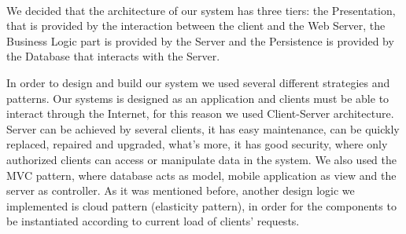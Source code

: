 	
	\paragraph{} We decided that the architecture of our system has three tiers: the Presentation, that is provided by the interaction between the client and the Web Server, the Business Logic part is provided by the Server and the Persistence is provided by the Database that interacts with the Server.  	
	
	 In order to design and build our system we used several different strategies and patterns. Our systems is designed as an application and clients must be able to interact through the Internet, for this reason we used Client-Server architecture. Server can be achieved by several clients, it has easy maintenance, can be quickly replaced, repaired and upgraded, what's more, it has good security, where only authorized clients can access or manipulate data in the system. We also used the MVC pattern, where database acts as model, mobile application as view and the server as controller.  As it was mentioned before, another design logic we implemented is  cloud pattern (elasticity pattern), in order for the components to be instantiated according to current load of clients' requests. 
	
		